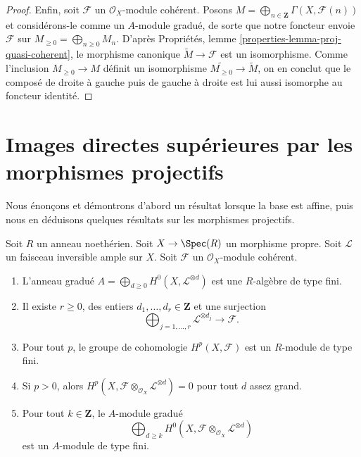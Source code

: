 \begin{proof}
\medskip\noindent
Enfin, soit $\mathcal{F}$ un $\mathcal{O}_X$-module cohérent.
Posons $M = \bigoplus_{n \in \mathbf{Z}} \Gamma(X, \mathcal{F}(n))$
et considérons-le comme un $A$-module gradué, de sorte que notre foncteur envoie $\mathcal{F}$ sur
$M_{\geq 0} = \bigoplus_{n \geq 0} M_n$.
D'après Propriétés, lemme \ref{properties-lemma-proj-quasi-coherent},
le morphisme canonique $\widetilde M \to \mathcal{F}$
est un isomorphisme. Comme l'inclusion
$M_{\geq 0} \to M$ définit un isomorphisme
$\widetilde{M_{\geq 0}} \to \widetilde M$, on en conclut
que le composé de droite à gauche puis de gauche à droite est lui aussi
isomorphe au foncteur identité.
\end{proof}










\section{Images directes supérieures par les morphismes projectifs}
\label{section-projective-pushforward}

\noindent
Nous énonçons et démontrons d'abord un résultat lorsque la base est affine, puis
nous en déduisons quelques résultats sur les morphismes projectifs.

\begin{lemma}
\label{lemma-coherent-proper-ample}
Soit $R$ un anneau noethérien. Soit $X \to \Spec(R)$ un morphisme propre.
Soit $\mathcal{L}$ un faisceau inversible ample sur $X$. Soit $\mathcal{F}$
un $\mathcal{O}_X$-module cohérent.
\begin{enumerate}
\item L'anneau gradué
$A = \bigoplus_{d \geq 0} H^0(X, \mathcal{L}^{\otimes d})$
est une $R$-algèbre de type fini.
\item Il existe $r \geq 0$, des entiers
$d_1, \ldots, d_r \in \mathbf{Z}$ et une surjection
$$
\bigoplus\nolimits_{j = 1, \ldots, r} \mathcal{L}^{\otimes d_j}
\longrightarrow \mathcal{F}.
$$
\item Pour tout $p$, le groupe de cohomologie $H^p(X, \mathcal{F})$ est un
$R$-module de type fini.
\item Si $p > 0$, alors
$H^p(X, \mathcal{F} \otimes_{\mathcal{O}_X} \mathcal{L}^{\otimes d}) = 0$
pour tout $d$ assez grand.
\item Pour tout $k \in \mathbf{Z}$, le $A$-module gradué
$$
\bigoplus\nolimits_{d \geq k}
H^0(X, \mathcal{F} \otimes_{\mathcal{O}_X} \mathcal{L}^{\otimes d})
$$
est un $A$-module de type fini.
\end{enumerate}
\end{lemma}


